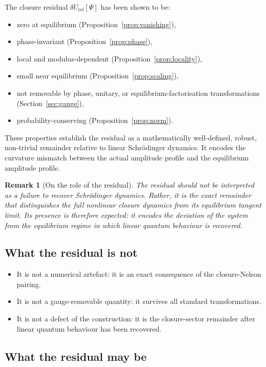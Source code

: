 \documentclass[12pt]{article}
\newtheorem{remark}[theorem]{Remark}
\newcommand{\dUrel}{\delta U_{\mathrm{rel}}}
\begin{document}
The closure residual $\dUrel[\Psi]$ has been shown to be:
\begin{itemize}
    \item zero at equilibrium (Proposition~\ref{prop:vanishing}),
    \item phase-invariant (Proposition~\ref{prop:phase}),
    \item local and modulus-dependent (Proposition~\ref{prop:locality}),
    \item small near equilibrium (Proposition~\ref{prop:scaling}),
    \item not removable by phase, unitary, or equilibrium-factorisation transformations (Section~\ref{sec:gauge}),
    \item probability-conserving (Proposition~\ref{prop:norm}).
\end{itemize}

These properties establish the residual as a mathematically well-defined, robust, non-trivial remainder relative to linear Schr\"odinger dynamics. It encodes the curvature mismatch between the actual amplitude profile and the equilibrium amplitude profile.

\begin{remark}[On the role of the residual]
The residual should not be interpreted as a failure to recover Schr\"odinger dynamics. Rather, it is the exact remainder that distinguishes the full nonlinear closure dynamics from its equilibrium tangent limit. Its presence is therefore expected: it encodes the deviation of the system from the equilibrium regime in which linear quantum behaviour is recovered.
\end{remark}

\subsection*{What the residual is not}

\begin{itemize}
    \item It is not a numerical artefact: it is an exact consequence of the closure-Nelson pairing.
    \item It is not a gauge-removable quantity: it survives all standard transformations.
    \item It is not a defect of the construction: it is the closure-sector remainder after linear quantum behaviour has been recovered.
\end{itemize}

\subsection*{What the residual may be}
\end{document}
